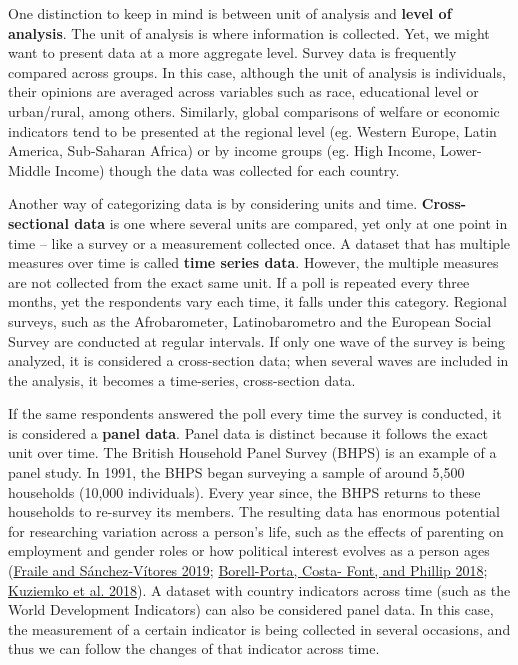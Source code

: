 \documentclass{book}
\begin{document}
One distinction to keep in mind is between unit of analysis and \textbf{level
of analysis}. The unit of analysis is where information is collected. Yet, we
might want to present data at a more aggregate level. Survey data is
frequently compared across groups. In this case, although the unit of analysis
is individuals, their opinions are averaged across variables such as race,
educational level or urban/rural, among others. Similarly, global comparisons
of welfare or economic indicators tend to be presented at the regional level
(eg. Western Europe, Latin America, Sub-Saharan Africa) or by income groups
(eg. High Income, Lower-Middle Income) though the data was collected for each
country.

Another way of categorizing data is by considering units and time.
\textbf{Cross-sectional data} is one where several units are compared, yet
only at one point in time -- like a survey or a measurement collected once. A
dataset that has multiple measures over time is called \textbf{time series
data}. However, the multiple measures are not collected from the exact same
unit. If a poll is repeated every three months, yet the respondents vary each
time, it falls under this category. Regional surveys, such as the
Afrobarometer, Latinobarometro and the European Social Survey are conducted at
regular intervals. If only one wave of the survey is being analyzed, it is
considered a cross-section data; when several waves are included in the
analysis, it becomes a time-series, cross-section data.

If the same respondents answered the poll every time the survey is conducted,
it is considered a \textbf{panel data}. Panel data is distinct because it
follows the exact unit over time. The British Household Panel Survey (BHPS) is
an example of a panel study. In 1991, the BHPS began surveying a sample of
around 5,500 households (10,000 individuals). Every year since, the BHPS
returns to these households to re-survey its members. The resulting data has
enormous potential for researching variation across a person's life, such as
the effects of parenting on employment and gender roles or how political
interest evolves as a person ages (\protect\hyperlink{ref-fraile2019}{Fraile
and Sánchez-Vítores 2019};
\protect\hyperlink{ref-borell-porta2018}{Borell-Porta, Costa- Font, and
Phillip 2018}; \protect\hyperlink{ref-kuziemko2018}{Kuziemko et al. 2018}). A
dataset with country indicators across time (such as the World Development
Indicators) can also be considered panel data. In this case, the measurement
of a certain indicator is being collected in several occasions, and thus we
can follow the changes of that indicator across time.
\end{document}
